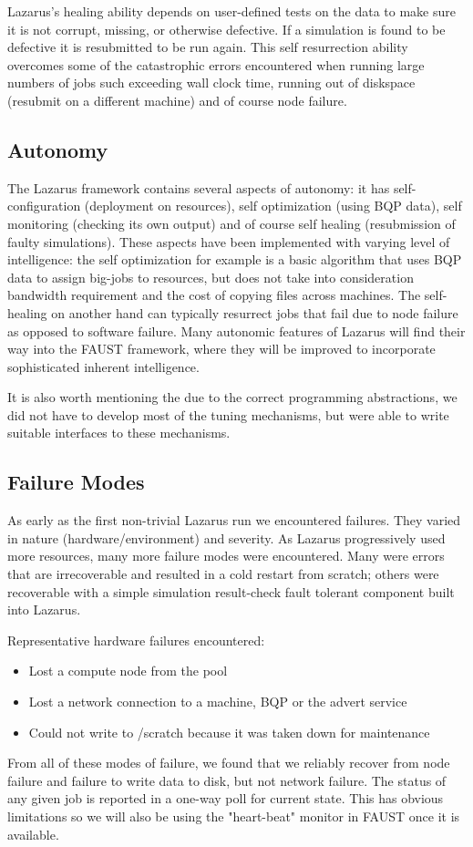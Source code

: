\documentclass[conference,final]{IEEEtran}
\begin{document}
Lazarus's healing ability depends on user-defined tests on the data to
make sure it is not corrupt, missing, or otherwise defective. If a
simulation is found to be defective it is resubmitted to be run
again. This self resurrection ability overcomes some of the
catastrophic errors encountered when running large numbers of jobs
such exceeding wall clock time, running out of diskspace (resubmit on
a different machine) and of course node failure.

\subsection{Autonomy}
The Lazarus framework contains several aspects of autonomy: it has
self-configuration (deployment on resources), self optimization (using
BQP data), self monitoring (checking its own output) and of course
self healing (resubmission of faulty simulations). These aspects have
been implemented with varying level of intelligence: the self
optimization for example is a basic algorithm that uses BQP data to
assign big-jobs to resources, but does not take into consideration
bandwidth requirement and the cost of copying files across
machines. The self-healing on another hand can typically resurrect
jobs that fail due to node failure as opposed to software
failure. Many autonomic features of Lazarus will find their way into
the FAUST framework, where they will be improved to incorporate
sophisticated inherent intelligence.  

It is also worth mentioning the due to the correct programming
abstractions, we did not have to develop most of the tuning
mechanisms, but were able to write suitable interfaces to these
mechanisms.


\subsection{Failure Modes}
As early as the first non-trivial Lazarus run we encountered failures. They
varied in nature (hardware/environment) and severity. As Lazarus progressively
used more resources, many more failure modes were encountered.
Many were errors that are irrecoverable and resulted in a
cold restart from scratch; others were recoverable with a simple simulation 
result-check fault tolerant component built into Lazarus.

Representative hardware failures encountered:
\begin{itemize}
\item{Lost a compute node from the pool}
\item{Lost a network connection to a machine, BQP or the advert service}
\item{Could not write to /scratch because it was taken down for maintenance}
\end{itemize}
From all of these modes of failure, we found that we reliably recover
from node failure and failure to write data to disk, but not network
failure. The status of any given job is reported in a one-way poll for
current state. This has obvious limitations so we will also be using
the "heart-beat" monitor in FAUST once it is available.
\end{document}
